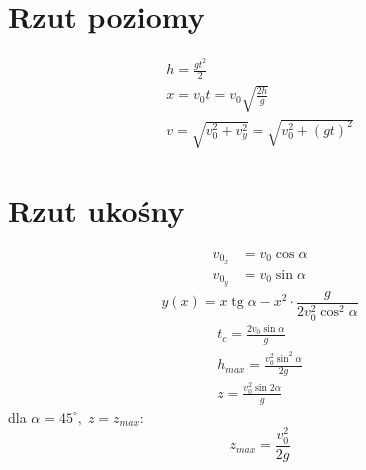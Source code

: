 \documentclass{report}
\numberwithin{equation}{chapter}
\DeclareMathOperator{\tg}{tg}
\begin{document}
    \section{Rzut poziomy}
      \begin{gather}
        h = \frac{gt^2}{2}\\
        x = v_0t = v_0\sqrt{\frac{2h}{g}}\\
        v = \sqrt{v_0^2 + v_y^2} = \sqrt{v_0^2 + (gt)^2}
      \end{gather}
    \section{Rzut ukośny}
      \begin{align}
        v_{0_x} &= v_0\cos\alpha\\
        v_{0_y} &= v_0\sin\alpha
      \end{align}
      \begin{equation}
        y(x) = x\tg\alpha - x^2\cdot \frac{g}{2v_0^2\cos^2\alpha}
      \end{equation}
      \begin{gather}
        t_c = \frac{2v_0\sin\alpha}{g}\\
        h_{max} = \frac{v_0^2\sin^2\alpha}{2g}\\
        z = \frac{v_0^2\sin 2\alpha}{g}
      \end{gather}
      dla $\alpha = 45^\circ,\; z = z_{max}$:
      \begin{equation}
        z_{max} = \frac{v_0^2}{2g}
      \end{equation}
\end{document}
